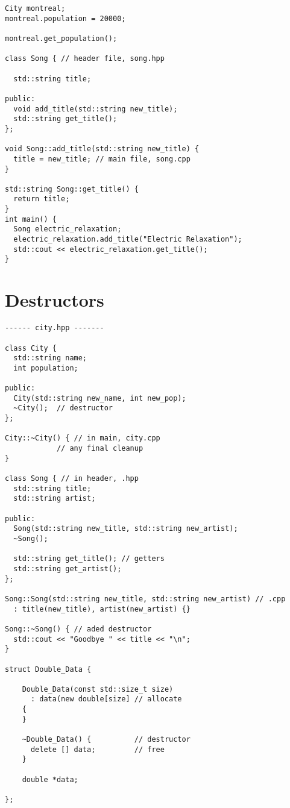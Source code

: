 \begin{verbatim}
City montreal;
montreal.population = 20000;

montreal.get_population();

class Song { // header file, song.hpp

  std::string title;

public:
  void add_title(std::string new_title);
  std::string get_title();
};

void Song::add_title(std::string new_title) {
  title = new_title; // main file, song.cpp
}

std::string Song::get_title() {
  return title;
}
int main() {
  Song electric_relaxation;
  electric_relaxation.add_title("Electric Relaxation");
  std::cout << electric_relaxation.get_title();
}
\end{verbatim}

\section{Destructors}

\begin{verbatim}
------ city.hpp -------

class City { 
  std::string name;
  int population;
 
public:
  City(std::string new_name, int new_pop);
  ~City();  // destructor
};
 
City::~City() { // in main, city.cpp
            // any final cleanup
}

class Song { // in header, .hpp
  std::string title;
  std::string artist;

public:
  Song(std::string new_title, std::string new_artist);
  ~Song();
  
  std::string get_title(); // getters
  std::string get_artist();
};

Song::Song(std::string new_title, std::string new_artist) // .cpp
  : title(new_title), artist(new_artist) {}

Song::~Song() { // aded destructor
  std::cout << "Goodbye " << title << "\n";
}

struct Double_Data {

    Double_Data(const std::size_t size)
      : data(new double[size] // allocate
    {
    }

    ~Double_Data() {          // destructor
      delete [] data;         // free
    }

    double *data;

};
\end{verbatim}

